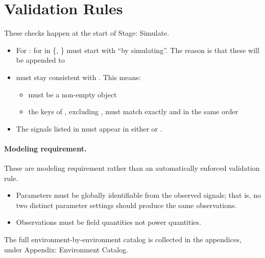 \documentclass[11pt]{article}
\begin{document}
\label{sec:environment-validation-rules}
\section*{Validation Rules}
These checks happen at the start of Stage: Simulate.
\begin{itemize}

\item For :  for \termDescLevel in \{, \} must start with ``by simulating''.
The reason is that these will be appended to 
\item {} must stay consistent with . This means:
\begin{itemize}
    \item {} must be a non-empty object
    \item the keys of , excluding , must match  exactly and in the same order
\end{itemize}
\item The signals listed in  must appear in either  or .

\end{itemize}
\paragraph{Modeling requirement.}
These are modeling requirement rather than an automatically enforced validation rule.
\begin{itemize}
\item Parameters must be globally identifiable from the observed signals; that is, no two distinct parameter settings should produce the same observations. 
\item Observations must be field quantities not power quantities.
\end{itemize}
The full environment-by-environment catalog is collected in the appendices, under Appendix: Environment Catalog.
\end{document}
